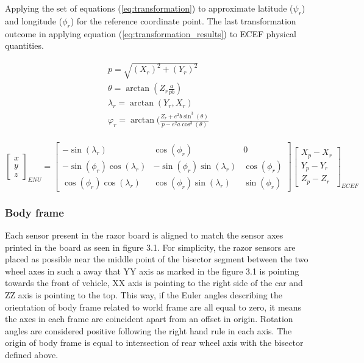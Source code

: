 Applying the set of equations (\ref{eq:transformation}) to approximate latitude ($\psi_r$) and longitude ($\phi_r$) for the reference coordinate point. The last transformation outcome in applying equation (\ref{eq:transformation_results}) to ECEF physical quantities.

\begin{equation}
    \begin{gathered}
        p = \sqrt{(X_r)^2 + (Y_r)^2} \\
        \theta = \arctan(Z_r\frac{a}{pb} ) \\
        \lambda_r = \arctan(Y_r,X_r) \\
        \varphi_r = \arctan(\frac{Z_r + e^2 b\sin^3(\theta)}{p - e^2 a \cos^3(\theta )}  \\
    \end{gathered}
    \label{eq:transformation}
\end{equation}

\begin{equation}
    \begin{bmatrix}
        x \\
        y \\
        z
    \end{bmatrix}_{ENU}
    =
    \begin{bmatrix}
        -\sin(\lambda_r)             & \cos( \phi_r)                 & 0            \\
        -\sin(\phi_r)\cos(\lambda_r) & -\sin( \phi_r)\sin(\lambda_r) & \cos(\phi_r) \\
        \cos(\phi_r)\cos(\lambda_r)  & \cos(\phi_r) \sin(\lambda_r)  & \sin(\phi_r)
    \end{bmatrix}
    \begin{bmatrix}
        X_p - X_r \\
        Y_p - Y_r \\
        Z_p - Z_r
    \end{bmatrix}_{ECEF}
    \label{eq:transformation_results}
\end{equation}

\subsubsection{Body frame}

Each sensor present in the razor board is aligned to match the sensor axes printed in the board as seen in figure 3.1. For simplicity, the razor sensors are placed as possible near the middle point of the bisector segment between the two wheel axes in such a away that YY axis as marked in the figure 3.1 is pointing towards the front of vehicle, XX axis is pointing to the right side of the car and ZZ axis is pointing to the top. This way, if the Euler angles describing the orientation of body frame related to world frame are all equal to zero, it means the axes in each frame are coincident apart from an offset in origin. Rotation angles are considered positive following the right hand rule in each axis. The origin of body frame is equal to intersection of rear wheel axis with the bisector defined above.

